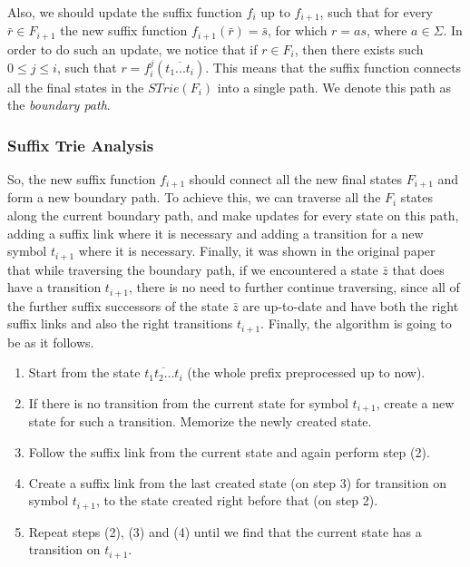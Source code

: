 \documentclass[paper=a4, fontsize=11pt]{scrartcl} %
\numberwithin{equation}{section} %
\numberwithin{figure}{section} %
\numberwithin{table}{section} %
\begin{document}
Also, we should update the suffix function $f_i$ up to $f_{i+1}$, such that for every $\bar{r} \in F_{i+1}$ the new suffix function $f_{i+1}(\bar{r}) = \bar{s}$, for which $r = as$, where $a \in \Sigma$. In order to do such an update, we notice that if $r \in F_i$, then there exists such $0 \le j \le i$, such that $r = f_i^j(\overline{t_1...t_i})$. This means that the suffix function connects all the final states in the $STrie(F_i)$ into a single path. We denote this path as the \textit{boundary path}.

\subsubsection{Suffix Trie Analysis}
So, the new suffix function $f_{i+1}$ should connect all the new final states $F_{i+1}$ and form a new boundary path. To achieve this, we can traverse all the $F_i$ states along the current boundary path, and make updates for every state on this path, adding a suffix link where it is necessary and adding a transition for a new symbol $t_{i+1}$ where it is necessary. Finally, it was shown in the original paper~\cite{ukkonen1995line} that while traversing the boundary path, if we encountered a state $\bar{z}$ that does have a transition $t_{i+1}$, there is no need to further continue traversing, since all of the further suffix successors of the state $\bar{z}$ are up-to-date and have both the right suffix links and also the right transitions $t_{i+1}$. Finally, the algorithm is going to be as it follows.

\begin{enumerate}
  \item Start from the state $\overline{t_1 t_2 \dots t_i}$ (the whole prefix preprocessed up to now).
  \item If there is no transition from the current state for symbol $t_{i+1}$, create a new state for such a transition. Memorize the newly created state.
  \item Follow the suffix link from the current state and again perform step (2).
  \item Create a suffix link from the last created state (on step 3) for transition on symbol $t_{i+1}$, to the state created right before that (on step 2).
  \item Repeat steps (2), (3) and (4) until we find that the current state has a transition on $t_{i+1}$.
\end{enumerate}
\end{document}
